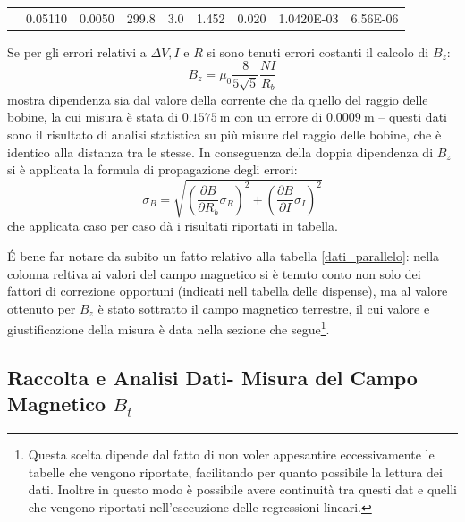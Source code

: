 \documentclass[a4paper,11pt]{article}
\begin{document}
\begin{table}[]
\begin{tabular}{lrrrrrrrr}
				\rowcolor[HTML]{C0C0C0} 
				\multicolumn{1}{l|}{\cellcolor[HTML]{BBDAFF}13} & \multicolumn{1}{r|}{\cellcolor[HTML]{C0C0C0}0.05110}              & \multicolumn{1}{r|}{\cellcolor[HTML]{C0C0C0}0.0050} & \multicolumn{1}{r|}{\cellcolor[HTML]{C0C0C0}299.8}                        & \multicolumn{1}{r|}{\cellcolor[HTML]{C0C0C0}3.0}       & \multicolumn{1}{r|}{\cellcolor[HTML]{C0C0C0}1.452}               & \multicolumn{1}{r|}{\cellcolor[HTML]{C0C0C0}0.020}     & \multicolumn{1}{r|}{\cellcolor[HTML]{C0C0C0}1.0420E-03}                  & \multicolumn{1}{r|}{\cellcolor[HTML]{C0C0C0}6.56E-06}  \\ \cline{2-9} 
			\end{tabular}
		\end{table}
		Se per gli errori relativi a $\Delta V, I$ e $R$ si sono tenuti errori costanti il calcolo di $B_z$:
		\[
		B_z = \mu_0 \frac{8}{5\sqrt{5}} \frac{NI}{R_b}
		\] 
		mostra dipendenza sia dal valore della corrente che da quello del raggio delle bobine, la cui misura è stata di $\SI{0.1575}{\meter}$ con un errore di $\SI{0.0009}{\meter}$ -- questi dati sono il risultato di analisi statistica su più misure del raggio delle bobine, che è identico alla distanza tra le stesse. In conseguenza della doppia dipendenza di $B_z$ si è applicata la formula di propagazione degli errori:
		\[
		\sigma_B = \sqrt{\left(\frac{\partial B}{\partial R_b} \sigma_R \right)^2 + \left(\frac{\partial B}{\partial I} \sigma_I \right)^2}
		\] 
		che applicata caso per caso dà i risultati riportati in tabella.
		
		\'E bene far notare da subito un fatto relativo alla tabella \ref{dati_parallelo}: nella colonna reltiva ai valori del campo magnetico si è tenuto conto non solo dei fattori di correzione opportuni (indicati nell tabella delle dispense), ma al valore ottenuto per $B_z$ è stato sottratto il campo magnetico terrestre, il cui valore e giustificazione della misura è data nella sezione che segue\footnote{Questa scelta dipende dal fatto di non voler appesantire eccessivamente le tabelle che vengono riportate, facilitando per quanto possibile la lettura dei dati. Inoltre in questo modo è possibile avere continuità tra questi dat e quelli che vengono riportati nell'esecuzione delle regressioni lineari.}.
		
		\subsection{Raccolta e Analisi Dati- Misura del Campo Magnetico $B_t$}
		
\end{document}
